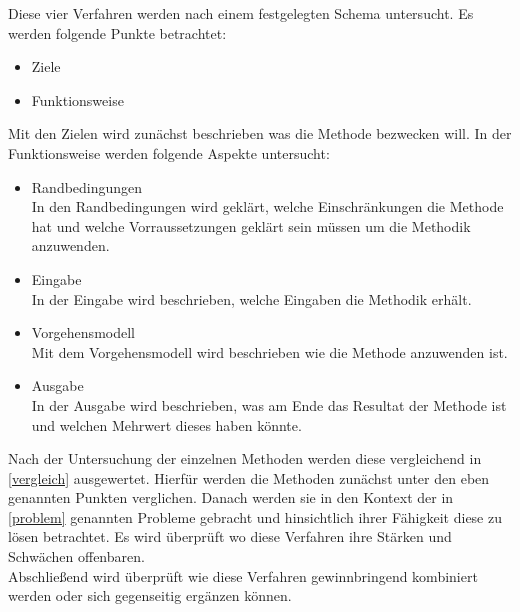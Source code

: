 Diese vier Verfahren werden nach einem festgelegten Schema untersucht. Es werden folgende Punkte betrachtet:\\

\begin{itemize}
\item Ziele
\item Funktionsweise\\
\end{itemize}

Mit den Zielen wird zunächst beschrieben was die Methode bezwecken will. In der Funktionsweise werden folgende Aspekte untersucht:\\

\begin{itemize}
\item Randbedingungen \\
In den Randbedingungen wird geklärt, welche Einschränkungen die Methode hat und welche Vorraussetzungen geklärt sein müssen um die Methodik anzuwenden.
\item Eingabe \\
In der Eingabe wird beschrieben, welche Eingaben die Methodik erhält.
\item Vorgehensmodell \\
Mit dem Vorgehensmodell wird beschrieben wie die Methode anzuwenden ist.
\item Ausgabe \\
In der Ausgabe wird beschrieben, was am Ende das Resultat der Methode ist und welchen Mehrwert dieses haben könnte.\\
\end{itemize}

Nach der Untersuchung der einzelnen Methoden werden diese vergleichend in \ref{vergleich} ausgewertet. Hierfür werden die Methoden zunächst unter den eben genannten Punkten verglichen. Danach werden sie in den Kontext der in \ref{problem} genannten Probleme gebracht und hinsichtlich ihrer Fähigkeit diese zu lösen betrachtet. Es wird überprüft wo diese Verfahren ihre Stärken und Schwächen offenbaren. \\

Abschließend wird überprüft wie diese Verfahren gewinnbringend kombiniert werden oder sich gegenseitig ergänzen können. 
